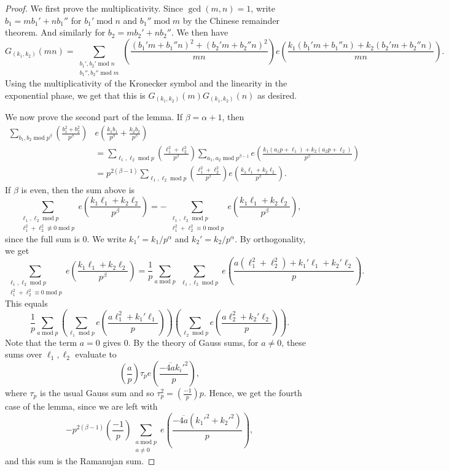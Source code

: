\documentclass[12pt]{amsart}
\def\mod{\operatorname{mod}}
\def\gcd{\operatorname{gcd}}
\begin{document}
\begin{proof}
    We first prove the multiplicativity. Since $\gcd(m,n)=1$, write $b_1 = m b_1'+ nb_1'' $ for $b_1' \mod n$ and $b_1'' \mod m$ by the Chinese remainder theorem. And similarly for $b_2=m b_2' + n b_2''$. We then have
    $$G_{(k_1,k_2)}(mn) = \sum_{\substack{b_1', b_2' \mod n \\ b_1'',b_2'' \mod m}}\left(\frac{(b_1' m+ b_1''n)^2+(b_2' m + b_2''n)^2}{mn} \right) e\left( \frac{k_1(b_1' m + b_1'' n) + k_2 (b_2' m + b_2'' n)}{mn} \right). $$
    Using the multiplicativity of the Kronecker symbol and the linearity in the exponential phase, we get that this is $G_{(k_1,k_2)}(m) G_{(k_1,k_2)}(n)$ as desired.

    We now prove the second part of the lemma. If $\beta=\alpha + 1$, then
    \begin{align*}
    \sum_{b_1,b_2 \mod p^{\beta}} \left( \frac{b_1^2+b_2^2}{p^{\beta}} \right) &e\left( \frac{k_1 b_1}{p^{\beta}} + \frac{k_2 b_2}{p^{\beta}}\right) \\
    &= \sum_{\ell_1 , \ell_2 \mod p} \left( \frac{\ell_1^2+\ell_2^2}{p^{\beta}} \right) \sum_{a_1 , a_2 \mod p^{\beta-1}} e\left( \frac{k_1 (a_1p + \ell_1) + k_2 (a_2p + \ell_2)}{p^{\beta}} \right) \\
    &= p^{2(\beta-1)} \sum_{\ell_1 , \ell_2 \mod p} \left( \frac{\ell_1^2+\ell_2^2}{p^{\beta}} \right) e\left( \frac{k_1 \ell_1 + k_2 \ell_2}{p^{\beta}} \right).
    \end{align*}
    If $\beta$ is even, then the sum above is
    $$ \sum_{\substack{\ell_1 , \ell_2 \mod p \\ \ell_1^2+\ell_2^2 \not\equiv 0 \mod p}} e\left( \frac{k_1 \ell_1 + k_2 \ell_2}{p^{\beta}} \right) = - \sum_{\substack{\ell_1 , \ell_2 \mod p \\ \ell_1^2+\ell_2^2 \equiv 0 \mod p}} e\left( \frac{k_1 \ell_1 + k_2 \ell_2}{p^{\beta}} \right) ,$$
    since the full sum is 0. We write $k_1'=k_1/p^{\alpha}$ and $k_2'= k_2/p^{\alpha}$. By orthogonality, we get
    $$ \sum_{\substack{\ell_1 , \ell_2 \mod p \\ \ell_1^2+\ell_2^2 \equiv 0 \mod p}} e\left( \frac{k_1 \ell_1 + k_2 \ell_2}{p^{\beta}} \right) = \frac{1}{p} \sum_{a\mod p}\sum_{\substack{\ell_1 , \ell_2 \mod p}} e\left( \frac{a(\ell_1^2+\ell_2^2) + k_1' \ell_1 + k_2' \ell_2}{p} \right) .$$
    This equals
    $$ \frac{1}{p}\sum_{a\mod p} \left( \sum_{\ell_1 \mod p} e\left( \frac{a\ell_1^2+ k_1'\ell_1}{p} \right) \right) \left(\sum_{\ell_2 \mod p} e\left( \frac{a\ell_2^2+ k_2'\ell_2}{p} \right) \right) . $$
    Note that the term $a=0$ gives $0$. By the theory of Gauss sums, for $a\not=0$, these sums over $\ell_1, \ell_2$ evaluate to
    $$ \left( \frac{a}{p} \right) \tau_p e\left( \frac{-\overline{4a}k_i'^2}{p} \right), $$
    where $\tau_p$ is the usual Gauss sum and so $\tau_p^2 = \left( \frac{-1}{p} \right)p$.
    Hence, we get the fourth case of the lemma, since we are left with
    $$ - p^{2(\beta-1)} \left( \frac{-1}{p} \right) \sum_{\substack{a \mod p \\ a\not= 0}}e\left( \frac{-\overline{4a}(k_1'^2+k_2'^2)}{p} \right) , $$
    and this sum is the Ramanujan sum.


\end{proof}
\end{document}
